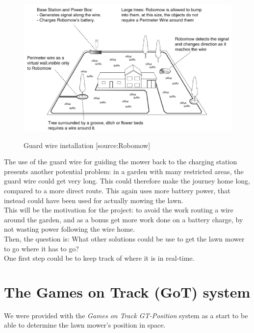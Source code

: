  
\begin{figure}[H]
\centering
\includegraphics[scale=0.6]{figures/robomow.png} 
\label{fig:robomow}
\caption{Guard wire installation [source:Robomow]} 
\end{figure}
\noindent

The use of the guard wire for guiding the mower back to the charging station presents another potential problem: in a garden with many restricted areas, the guard wire could get very long. This could therefore make the journey home long, compared to a more direct route. This again uses more battery power, that instead could have been used for actually mowing the lawn.\\

\noindent
This will be the motivation for the project: to avoid the work routing a wire around the garden, and as a bonus get more work done on a battery charge, by not wasting power following the wire home.\\

\noindent
Then, the question is: What other solutions could be use to get the lawn mower to go where it has to go? \\
One first step could be to keep track of where it is in real-time.

\section{The Games on Track (GoT) system}
We were provided with the \emph{Games on Track GT-Position} system as a start to be able to determine the lawn mower's position in space.\\

